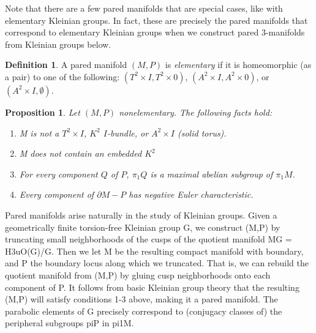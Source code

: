 \documentclass[12pt]{amsart}
\newtheorem{prop}[theorem]{Proposition}
\theoremstyle{definition}
\newtheorem{Def}[theorem]{Definition}
\def\x{\times}
\def\d{\partial}
\begin{document}
Note that there are a few pared manifolds that are special cases,
like with elementary Kleinian groups. In fact, these are precisely the pared
manifolds that correspond to elementary Kleinian groups when we construct pared
3-manifolds from Kleinian groups below.

\begin{Def}

A pared manifold $(M,P)$ is \emph{elementary} if it is homeomorphic (as a pair)
to one of the following: $(T^2\x I,T^2\x 0)$, $(A^2\x I,A^2\x 0)$, or $(A^2\x
I,\emptyset)$.

\end{Def}

\begin{prop}

Let $(M,P)$ nonelementary. The following facts hold:

\begin{enumerate}
\item M is not a $T^2\x I$, $K^2$ $I$-bundle, or $A^2\x I$ (solid torus).
\item M does not contain an embedded $K^2$
\item For every component $Q$ of $P$, $\pi_1Q$ is a maximal abelian subgroup of
$\pi_1M$.
\item Every component of $\d M-P$ has negative Euler characteristic.
\end{enumerate}

\end{prop}

Pared manifolds arise naturally in the study of Kleinian groups. Given
a geometrically finite torsion-free Kleinian group G, we construct (M,P) by
truncating small neighborhoods of the cusps of the quotient manifold MG
= H3uO(G)/G.  Then we let M be the resulting compact manifold with boundary,
and P the boundary locus along which we truncated. That is, we can rebuild the
quotient manifold from (M,P) by gluing cusp neighborhoods onto each component
of P. It follows from basic Kleinian group theory that the resulting (M,P) will
satisfy conditions 1-3 above, making it a pared manifold. The parabolic
elements of G precisely correspond to (conjugacy classes of) the peripheral
subgroups piP in pi1M.
\end{document}
